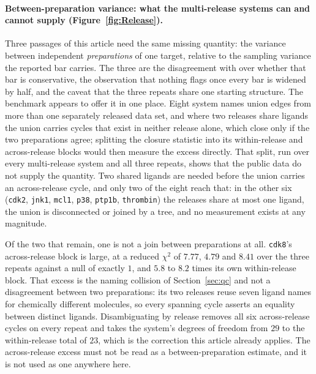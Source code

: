 \paragraph{Between-preparation variance: what the multi-release systems can and cannot supply
(Figure~\ref{fig:Release}).} Three passages of this article need the same missing quantity: the
variance between independent \emph{preparations} of one target, relative to the sampling variance
the reported bar carries. The three are the disagreement with \citet{wade2022estimators} over whether
that bar is conservative, the observation that nothing flags once every bar is widened by half, and
the caveat that the three repeats share one starting structure. The benchmark appears to offer it
in one place. Eight system names union edges from more than one separately released data set, and
where two releases share ligands the union carries cycles that exist in neither release alone,
which close only if the two preparations agree; splitting the closure statistic into its
within-release and across-release blocks would then measure the excess directly. That split, run
over every multi-release system and all three repeats, shows that the public data do not supply the
quantity. Two shared ligands are needed before the union carries an across-release cycle, and only
two of the eight reach that: in the other six (\texttt{cdk2}, \texttt{jnk1},
\texttt{mcl1}, \texttt{p38}, \texttt{ptp1b}, \texttt{thrombin}) the releases share at most one
ligand, the union is disconnected or joined by a tree, and no measurement exists at any magnitude.

Of the two that remain, one is not a join between preparations at all. \texttt{cdk8}'s across-release
block is large, at a reduced $\chi^2$ of $7.77$, $4.79$ and $8.41$ over the three repeats against a
null of exactly $1$, and $5.8$ to $8.2$ times its own within-release block. That excess is the
naming collision of Section~\ref{sec:qc} and not a disagreement between two preparations: its two
releases reuse seven ligand names for chemically different molecules, so every spanning cycle
asserts an equality between distinct ligands. Disambiguating by release removes all six
across-release cycles on every repeat and takes the system's degrees of freedom from $29$ to the
within-release total of $23$, which is the correction this article already applies. The
across-release excess must not be read as a between-preparation estimate, and it is not used as one
anywhere here.

